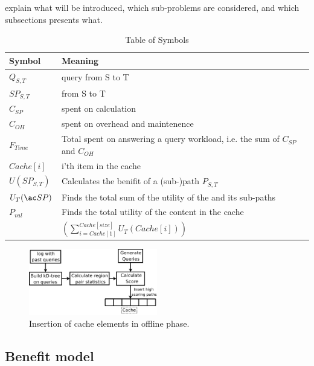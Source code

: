 explain what will be introduced, which sub-problems are considered, and which subsections presents what.


\begin{table}
\begin{tabular*}{\columnwidth}{|l||p{}|}
\hline
\bf Symbol		& \bf Meaning \\\hline
$Q_{S,T}$		& \spath query from S to T \\\hline
$SP_{S,T}$		& \spath from S to T \\\hline
$C_{SP}$		& \cet spent on \spath calculation \\\hline
$C_{OH}$		& \cet spent on overhead and maintenence \\\hline
$F_{Time}$		& Total \cet spent on answering a query workload, i.e. the sum of  $C_{SP}$ and $C_{OH}$\\\hline
$Cache[i]$		& i'th item in the cache \\\hline
$U(SP_{S,T})$		& Calculates the benifit of a (sub-)path $P_{S,T}$ \\\hline
$U_T(\spath)$		& Finds the total sum of the utility of the \spath and its sub-paths \\\hline
$P_{val}$	& Finds the total utility of the content in the cache \\ 
			& $\left(\sum\limits_{i=Cache[1]}^{Cache[size]} U_T\left(Cache[i]\right)\right)$ \\\hline

\end{tabular*}
\caption{Table of Symbols}
\label{tab:symbols}
\end{table}


\begin{figure}[bht]
  \center
        \includegraphics[width=0.5\textwidth]{figures/fillcache}
        \caption{Insertion of cache elements in offline phase.}
  \label{fig:fillcache}
\end{figure}


\subsection{Benefit model}

